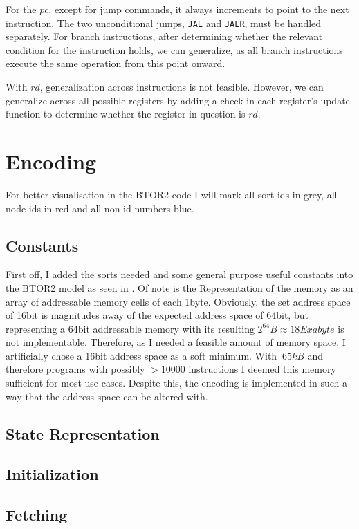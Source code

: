 For the $pc$, except for jump commands, it always increments to point to the
next instruction. The two unconditional jumps, \texttt{JAL} and \texttt{JALR},
must be handled separately. For branch instructions, after determining whether
the relevant condition for the instruction holds, we can generalize, as all
branch instructions execute the same operation from this point onward.

With $rd$, generalization across instructions is not feasible. However, we can
generalize across all possible registers by adding a check in each register's
update function to determine whether the register in question is $rd$.

\section{Encoding}
For better visualisation in the BTOR2 code I will mark all sort-ids in
\textcolor{UniGrey}{grey}, all node-ids in \textcolor{UniRed}{red} and all
non-id numbers \textcolor{UniBlue}{blue}.

\subsection{Constants}
First off, I added the sorts needed and some general purpose useful constants
into the BTOR2 model as seen in .
 Of note is the Representation of
the memory as an array of addressable memory cells of each 1byte. Obviously,
the set address space of 16bit is magnitudes away of the expected address space
of 64bit, but representing a 64bit addressable memory with its resulting
$2^{64}B \approx 18 Exabyte$ is not implementable. Therefore, as I needed a
feasible amount of memory space, I artificially chose a 16bit address space as
a soft minimum. With $~65kB$ and therefore programs with possibly $>10000$
instructions I deemed this memory sufficient for most use cases. Despite this,
the encoding is implemented in such a way that the address space can be altered
with. 

\subsection{State Representation}
\subsection{Initialization}
\subsection{Fetching}
